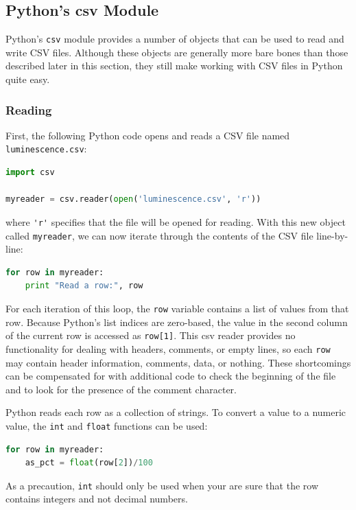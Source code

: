 \subsection{Python's csv Module}

Python's \lstinline!csv! module provides a number of objects that can be
used to read and write CSV files. Although these objects are generally
more bare bones than those described later in this section, they still
make working with CSV files in Python quite easy.

\subsubsection{Reading}

First, the following Python code opens and reads a CSV file named
\lstinline!luminescence.csv!:

\begin{lstlisting}[language=Python]
import csv

myreader = csv.reader(open('luminescence.csv', 'r'))
\end{lstlisting}
where \lstinline!'r'! specifies that the file will be opened for
reading. With this new object called \lstinline!myreader!, we can now
iterate through the contents of the CSV file line-by-line:

\begin{lstlisting}[language=Python]
for row in myreader:
    print "Read a row:", row
\end{lstlisting}
For each iteration of this loop, the \lstinline!row! variable contains a
list of values from that row. Because Python's list indices are
zero-based, the value in the second column of the current row is
accessed as \lstinline!row[1]!. This csv reader provides no
functionality for dealing with headers, comments, or empty lines, so
each \lstinline!row! may contain header information, comments, data, or
nothing. These shortcomings can be compensated for with additional code
to check the beginning of the file and to look for the presence of the
comment character.

Python reads each row as a collection of strings. To convert a value to
a numeric value, the \lstinline!int! and \lstinline!float! functions can
be used:

\begin{lstlisting}[language=Python]
for row in myreader:
    as_pct = float(row[2])/100
\end{lstlisting}
As a precaution, \lstinline!int! should only be used when your are sure
that the row contains integers and not decimal numbers.

